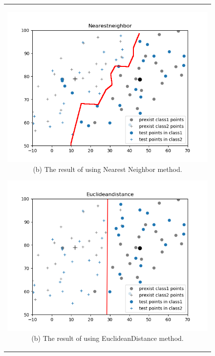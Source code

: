 \documentclass[10.5pt]{jsarticle}
\begin{document}
\begin{figure}[htbp]
  \centering
  \begin{tabular}{c}
  	\begin{minipage}{0.56\hsize}
  	\centering
  		\includegraphics[width=15.0cm, bb=9 9 700 270]{results/NearestneighborResultFigureA.png}
  		\hspace{0cm} (b) The result of using Nearest Neighbor method.
  	\end{minipage}

  	\begin{minipage}{0.5\hsize}
  	\centering
  		\includegraphics[width=15.0cm, bb=9 9 700 270]{results/EuclideandistanceResultFigureA.png}
  		\hspace{0cm} (b) The result of using EuclideanDistance method.
  	\end{minipage}
  \end{tabular}
\end{figure}
\end{document}
